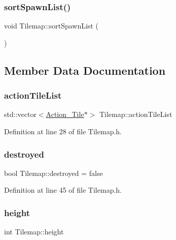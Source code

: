 \subsubsection{\texorpdfstring{sort\+Spawn\+List()}{sortSpawnList()}}
{\footnotesize\ttfamily void Tilemap\+::sort\+Spawn\+List (\begin{DoxyParamCaption}{ }\end{DoxyParamCaption})}



\subsection{Member Data Documentation}
\hypertarget{class_tilemap_ad855bfd20bf768d4f712fe40c5fcaeea}{}\label{class_tilemap_ad855bfd20bf768d4f712fe40c5fcaeea} 
\subsubsection{\texorpdfstring{action\+Tile\+List}{actionTileList}}
{\footnotesize\ttfamily std\+::vector$<$\hyperlink{class_action___tile}{Action\+\_\+\+Tile}$\ast$$>$ Tilemap\+::action\+Tile\+List}



Definition at line 28 of file Tilemap.\+h.

\hypertarget{class_tilemap_af966f7c50449d758cb11abdec5767f64}{}\label{class_tilemap_af966f7c50449d758cb11abdec5767f64} 
\subsubsection{\texorpdfstring{destroyed}{destroyed}}
{\footnotesize\ttfamily bool Tilemap\+::destroyed = false}



Definition at line 45 of file Tilemap.\+h.

\hypertarget{class_tilemap_a65d3108ef1805edef0df66843e8d5e6a}{}\label{class_tilemap_a65d3108ef1805edef0df66843e8d5e6a} 
\subsubsection{\texorpdfstring{height}{height}}
{\footnotesize\ttfamily int Tilemap\+::height}



